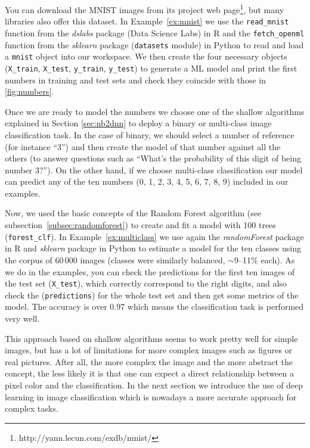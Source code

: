 You can download the MNIST images from its project web page\footnote{http://yann.lecun.com/exdb/mnist/}, but many libraries also offer this dataset. In Example~\ref{ex:mnist} we use the \texttt{read\_mnist} function from the \emph{dslabs} package (Data Science Labs) in R and the \texttt{fetch\_openml} function from the \emph{sklearn} package (\texttt{datasets} module) in Python to read and load a \texttt{mnist} object into our workspace. We then create the four necessary objects (\texttt{X\_train}, \texttt{X\_test}, \texttt{y\_train}, \texttt{y\_test}) to generate a ML model and print the first numbers in training and test sets and check they coincide with those in \ref{fig:numbers}.


Once we are ready to model the numbers we choose one of the shallow algorithms explained in Section \ref{sec:nb2dnn} to deploy a binary or multi-class image classification task. In the case of binary, we should select a number of reference (for instance ``3'') and then create the model of that number against all the others (to answer questions such as ``What's the probability of this digit of being number 3?''). On the other hand, if we choose multi-class classification our model can predict any of the ten numbers (0, 1, 2, 3, 4, 5, 6, 7, 8, 9) included in our examples.

Now, we used the basic concepts of the Random Forest algorithm (see subsection~\ref{subsec:randomforest}) to create and fit a model with 100 trees (\texttt{forest\_clf}). In Example~\ref{ex:multiclass} we use again the \emph{randomForest} package in R and \emph{sklearn} package in Python to estimate a model for the ten classes using the corpus of 60\,000 images (classes were similarly balanced, $\sim$9--11\% each). As we do in the examples, you can check the predictions for the first ten images of the test set (\texttt{X\_test}), which correctly correspond to the right digits, and also check the (\texttt{predictions}) for the whole test set and then get some metrics of the model. The accuracy is over 0.97 which means the classification task is performed very well.


This approach based on shallow algorithms seems to work pretty well for simple images, but has a lot of limitations for more complex images such as figures or real pictures. After all, the more complex the image and the more abstract the concept, the less likely it is that one can expect a direct relationship between a pixel color and the classification. In the next section we introduce the use of deep learning in image classification which is nowadays a more accurate approach for complex tasks.



